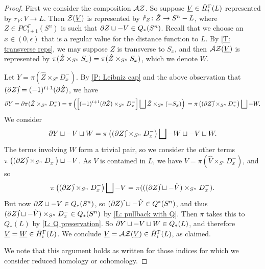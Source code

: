 \begin{proof}
	First we consider the composition $\mathcal{A} \mathcal{Z}$.
	So suppose $\underline{V} \in \tilde H_i^\Gamma(L)$ represented by $r_V \colon V \to L$.
	Then $\mathcal{Z}(\underline{V})$ is represented by $\mathring{r}_Z \colon \mathring{Z} \to S^n-L$, where $Z \in PC_{i+1}^\Gamma(S^n)$ is such that $\partial Z \sqcup -V \in Q_*(S^n)$.
	Recall that we choose an $x \in (0,\epsilon)$ that is a regular value for the distance function to $L$.
	By \cref{T: transverse reps}, we may suppose $Z$ is transverse to $S_x$, and then $\mathcal{A} \mathcal{Z}(\underline{V})$ is represented by $\pi(\mathring{Z} \times_{S^n} S_x) = \pi(\hat Z \times_{S^n} S_x)$, which we denote $W$.

	Let $Y = \pi(\hat Z \times_{S^n} D_x^-)$.
	By \cref{P: Leibniz cap} and the above observation that $(\bd Z)\hat{\vrule height1.3ex width0pt} = (-1)^{i+1} (\bd \hat Z)$, we have
	\begin{equation*}
		\bd Y = \bd \pi(\hat Z \times_{S^n} D_x^-)
		= \pi\left(\left[(-1)^{i+1} (\bd \hat Z) \times_{S^n} D_x^-\right] \bigsqcup \hat Z \times_{S^n} (-S_x)\right)\\
		= \pi\left((\bd Z)\hat{\vrule height1.3ex width0pt} \times_{S^n} D_x^- \right) \bigsqcup -W.
	\end{equation*}
	We consider
	\begin{equation*}
		\bd Y \sqcup -V\sqcup W =\pi\left((\bd Z)\hat{\vrule height1.3ex width0pt} \times_{S^n} D_x^- \right) \bigsqcup -W \sqcup -V \sqcup W.
	\end{equation*}
	The terms involving $W$ form a trivial pair, so we consider the other terms $\pi\left((\bd Z)\hat{\vrule height1.3ex width0pt} \times_{S^n} D_x^- \right) \sqcup -V$.
	As $V$ is contained in $L$, we have $V = \pi(\hat V \times_{S^n} D_x^-)$, and so
	$$\pi\left((\bd Z)\hat{\vrule height1.3ex width0pt} \times_{S^n} D_x^- \right) \bigsqcup -V = \pi(((\bd Z)\hat{\vrule height1.3ex width0pt} \sqcup -\hat V) \times_{S^n} D_x^-).$$
	But now $\partial Z \sqcup -V \in Q_*(S^n)$, so $(\bd Z)\,\hat{\vrule height1.3ex width0pt} \sqcup -\hat V \in Q^*(S^n)$, and thus $(\bd Z)\hat{\vrule height1.3ex width0pt} \sqcup -\hat V) \times_{S^n} D_x^- \in Q_*(S^n)$ by \cref{L: pullback with Q}.
	Then $\pi$ takes this to $Q_*(L)$ by \cref{L: Q preservation}.
	So $\partial Y \sqcup -V \sqcup W \in Q_*(L)$, and therefore $\underline{V} = \underline{W} \in \tilde H_i^\Gamma(L)$.
	We conclude $\underline{V} = \mathcal{A} \mathcal{Z}(\underline{V}) \in \tilde H_i^\Gamma(L)$, as claimed.

	We note that this argument holds as written for those indices for which we consider reduced homology or cohomology.


\end{proof}
